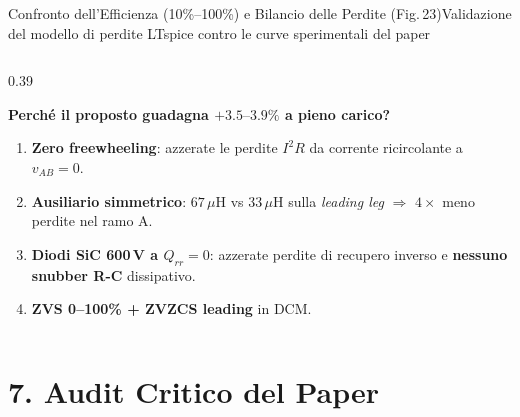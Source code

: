\documentclass[aspectratio=169,9pt]{beamer}
\newcommand{\uH}{\,\mu\text{H}}
\begin{document}
\begin{frame}{Confronto dell'Efficienza (10\%--100\%) e Bilancio delle Perdite (Fig.\,23)}{Validazione del modello di perdite LTspice contro le curve sperimentali del paper}
\begin{columns}[T,onlytextwidth]
\begin{column}{0.39\textwidth}
      \vspace*{2mm}
      \raggedright
      \textbf{\color{PrimaryBlue}Perch\'e il proposto guadagna $+3.5\text{--}3.9\%$ a pieno carico?}
      \begin{enumerate}\setlength{\itemsep}{1.8pt}
        \item \textbf{Zero freewheeling}: azzerate le perdite $I^2R$ da corrente ricircolante a $v_{AB}=0$.
        \item \textbf{Ausiliario simmetrico}: $67\uH$ vs $33\uH$ sulla \emph{leading leg} $\Rightarrow$ $4\times$ meno perdite nel ramo A.
        \item \textbf{Diodi SiC 600\,V a $Q_{rr}=0$}: azzerate perdite di recupero inverso e \textbf{nessuno snubber R-C} dissipativo.
        \item \textbf{ZVS 0--100\% + ZVZCS leading} in DCM.
      \end{enumerate}
    \end{column}
  \end{columns}
\end{frame}

\section{7. Audit Critico del Paper}
\end{document}
